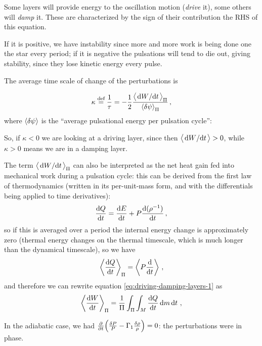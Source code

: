 \documentclass[main.tex]{subfiles}
\begin{document}
Some layers will provide energy to the oscillation motion (\emph{drive} it), some others will \emph{damp} it.
These are characterized by the sign of their contribution the RHS of this equation.

If it is positive, we have instability since more and more work is being done one the star every period; if it is negative the pulsations will tend to die out, giving stability, since they lose kinetic energy every pulse.

The average time scale of change of the perturbations is

\begin{equation}
  \kappa \defeq \frac{1}{\tau} = -\frac{1}{2} \frac{\expval{\dv*{W}{t}}_\Pi}{\expval{ \delta \psi}_\Pi }
\,,
\end{equation}
%
where \(\expval{ \delta \psi }\) is the ``average pulsational energy per pulsation cycle'': 

So, if \(\kappa < 0\) we are looking at a driving layer, since then \(\expval{ \dv*{W}{t}} >0\), while \(\kappa > 0\) means we are in a damping layer. 

The term \(\expval{\dv*{W}{t}}_\Pi \) can also be interpreted as the net heat gain fed into mechanical work during a pulsation cycle: this can be derived from the first law of thermodynamics (written in its per-unit-mass form, and with the differentials being applied to time derivatives): 
%
\begin{align}
\dv{Q}{t} = \dv{E}{t} + P \dv{(\rho^{-1})}{t}
\,,
\end{align}
%
so if this is averaged over a period the internal energy change is approximately zero (thermal energy changes on the thermal timescale, which is much longer than the dynamical timescale), so we have 
%
\begin{align}
\expval{\dv{Q}{t}}_{\Pi } = \expval{P \dv{}{t} (\rho^{-1})}
\,,
\end{align}
%
and therefore we can rewrite equation \eqref{eq:driving-damping-layers-1} as 
%
\begin{align}
\expval{\dv{W}{t}}_{\Pi } = \frac{1}{\Pi } \int_{\Pi } \int_{M} \dv{Q}{t} \dd{m} \dd{t}
\,,
\end{align}
%


In the adiabatic case, we had \(\pdv{}{t}\qty( \frac{\delta P}{P} - \Gamma_1 \frac{\delta \rho}{\rho}) =0 \): the perturbations were in phase.
\end{document}
